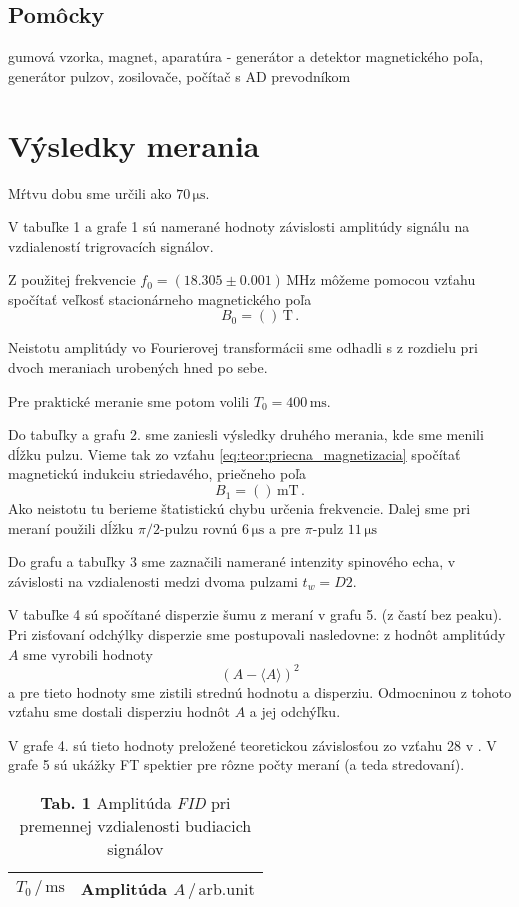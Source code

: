 \documentclass[a4paper, 10pt]{article}
\newcommand{\unit}[1]{\ensuremath{\, \mathrm{#1}}}
\begin{document}
\subsection*{Pomôcky}
gumová vzorka, magnet, aparatúra - generátor a detektor magnetického poľa, generátor pulzov, zosilovače, počítač s AD prevodníkom
\section*{Výsledky merania}
Mŕtvu dobu sme určili ako $70\unit{\mu s}$.

V tabuľke 1 a grafe 1 sú namerané hodnoty závislosti amplitúdy signálu na vzdialeností trigrovacích signálov.

Z použitej frekvencie $f_0 = (18.305\pm0.001)\unit{MHz}$ môžeme pomocou vzťahu \label{eq:teor:uhlova_rychost} spočítať veľkosť stacionárneho magnetického poľa
$$B_0 = () \unit{T}\,.$$

Neistotu amplitúdy vo Fourierovej transformácii sme odhadli s z rozdielu pri dvoch meraniach urobených hned po sebe. 

Pre praktické meranie sme potom volili $T_0 = 400\unit{ms}$.

Do tabuľky a grafu 2. sme zaniesli výsledky druhého merania, kde sme menili dĺžku pulzu. Vieme tak zo vzťahu \ref{eq:teor:priecna_magnetizacia} spočítať magnetickú indukciu striedavého, priečneho poľa
$$B_1 = () \unit{mT}\,.$$
Ako neistotu tu berieme štatistickú chybu určenia frekvencie. 
Dalej sme pri meraní použili dĺžku $\pi/2$-pulzu rovnú $6\unit{\mu s}$ a pre $\pi$-pulz $11\unit{\mu s}$

Do grafu a tabuľky 3 sme zaznačili namerané intenzity spinového echa, v závislosti na vzdialenosti medzi dvoma pulzami $t_w = D2$. 


V tabuľke 4 sú spočítané disperzie šumu z meraní v grafu 5. (z častí bez peaku). Pri zisťovaní odchýlky disperzie sme postupovali nasledovne: z hodnôt amplitúdy $A$ sme vyrobili hodnoty $$(A - \langle A\rangle)^2 $$
a pre tieto hodnoty sme zistili strednú hodnotu a disperziu. Odmocninou z tohoto vzťahu sme dostali disperziu hodnôt $A$ a jej odchýľku.

V grafe 4. sú tieto hodnoty preložené teoretickou závislosťou zo vzťahu 28 v \cite{pokyny}. V grafe 5 sú ukážky FT spektier pre rôzne počty meraní (a teda stredovaní).


\begin{table}[h!]
\centering
\hspace*{60pt}
\begin{tabular}{c|c}
$ T_0\,/\unit{ms} $ & 
 Amplitúda $ A\,/\unit{arb. unit} $
\\
\midrule 

\end{tabular}
\newline
\vspace*{2pt}
\caption*{\textbf{ Tab. 1} Amplitúda \textit{FID} pri premennej vzdialenosti budiacich signálov}
\end{table}
\end{document}
